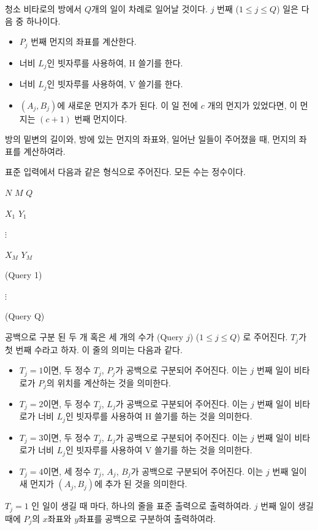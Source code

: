 \begin{problem}{청소}
	비타로의 방에서 $Q$개의 일이 차례로 일어날 것이다. $j$ 번째 ($1 \le j \le Q$) 일은 다음 중 하나이다.
	
	\begin{itemize}
		\item $P_j$ 번째 먼지의 좌표를 계산한다.
		\item 너비 $L_j$인 빗자루를 사용하여, H 쓸기를 한다.
		\item 너비 $L_j$인 빗자루를 사용하여, V 쓸기를 한다.
		\item $(A_j, B_j)$에 새로운 먼지가 추가 된다. 이 일 전에 $c$ 개의 먼지가 있었다면, 이 먼지는 $(c+1)$ 번째 먼지이다.
	\end{itemize}
	
	방의 밑변의 길이와, 방에 있는 먼지의 좌표와, 일어난 일들이 주어졌을 때, 먼지의 좌표를 계산하여라.
	
	\InputFile
	
	표준 입력에서 다음과 같은 형식으로 주어진다. 모든 수는 정수이다.
	
	$N$ $M$ $Q$
	
	$X_1$ $Y_1$
	
	$\vdots$
	
	$X_M$ $Y_M$ 
	
	(Query 1)
	
	$\vdots$
	
	(Query Q)
	
	공백으로 구분 된 두 개 혹은 세 개의 수가 (Query $j$) ($1 \le j \le Q$) 로 주어진다. $T_j$가 첫 번째 수라고 하자. 이 줄의 의미는 다음과 같다.
	
	\begin{itemize}
		\item $T_j=1$이면, 두 정수 $T_j$, $P_j$가 공백으로 구분되어 주어진다. 이는 $j$ 번째 일이 비타로가 $P_j$의 위치를 계산하는 것을 의미한다.
		\item $T_j=2$이면, 두 정수 $T_j$, $L_j$가 공백으로 구분되어 주어진다. 이는 $j$ 번째 일이 비타로가 너비 $L_j$인 빗자루를 사용하여 H 쓸기를 하는 것을 의미한다.
		\item $T_j=3$이면, 두 정수 $T_j$, $L_j$가 공백으로 구분되어 주어진다. 이는 $j$ 번째 일이 비타로가 너비 $L_j$인 빗자루를 사용하여 V 쓸기를 하는 것을 의미한다.
		\item $T_j=4$이면, 세 정수 $T_j$, $A_j$, $B_j$가 공백으로 구분되어 주어진다. 이는 $j$ 번째 일이 새 먼지가 $(A_j, B_j)$에 추가 된 것을 의미한다.
	\end{itemize}
	
	
	\OutputFile
	
	
	$T_j=1$ 인 일이 생길 때 마다, 하나의 줄을 표준 출력으로 출력하여라. $j$ 번째 일이 생길 때에 $P_j$의 $x$좌표와 $y$좌표를 공백으로 구분하여 출력하여라.
	

\end{problem}
